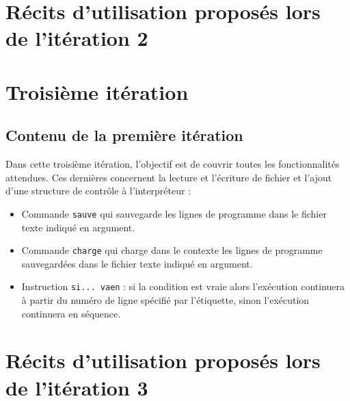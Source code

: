 \documentclass[12pt,a4paper,titlepage,openany, oneside]{report}
\begin{document}
    \footnotesize
    \chapter*{Récits d'utilisation proposés lors de l'itération 2}
    
    \newpage
    
    
    
    
    
    
    
    
    
    

    \large
    \chapter{Troisième itération}
    \section*{Contenu de la première itération}
    Dans cette troisième itération, l'objectif est de couvrir toutes
    les fonctionnalités attendues. Ces dernières  concernent la
    lecture et l'écriture de fichier et l'ajout d'une structure de
    contrôle à l'interpréteur :
    \begin{itemize}
        \item Commande \verb|sauve| qui sauvegarde les lignes de
              programme dans le fichier texte indiqué en argument.
        \item Commande \verb|charge| qui charge dans le contexte
              les lignes de programme sauvegardées dans le fichier
              texte indiqué en argument.
        \item Instruction \verb|si... vaen| : si la condition est
              vraie alors l'exécution continuera à partir du numéro
              de ligne spécifié par l’étiquette, sinon l'exécution
              continuera en séquence.
    \end{itemize}

    \footnotesize
    \chapter*{Récits d'utilisation proposés lors de l'itération 3}
    
    \newpage
    
    
\end{document}

